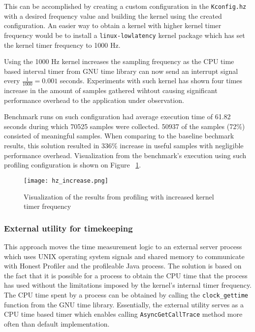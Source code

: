 \documentclass[..thesis.tex]{subfiles}
\begin{document}
This can be accomplished by creating a custom configuration in the \texttt{Kconfig.hz} with a desired frequency value and building the kernel using the created configuration. An easier way to obtain a kernel with higher kernel timer frequency would be to install a \texttt{linux-lowlatency} kernel package which has set the kernel timer frequency to 1000 Hz.

Using the 1000 Hz kernel increases the sampling frequency as the CPU time based interval timer from GNU time library can now send an interrupt signal every $\frac{1}{1000} = 0.001$ seconds. Experiments with such kernel has shown four times increase in the amount of samples gathered wihtout causing significant performance overhead to the application under observation.

Benchmark runs on such configuration had average execution time of 61.82 seconds during which 70525 samples were collected. 50937 of the samples (72\%) consisted of meaningful samples.
When comparing to the baseline bechmark results, this solution resulted in 336\% increase in useful samples with negligible performance overhead. Visualization from the benchmark's execution using such profiling configuration is shown on Figure ~\ref{fig:hz_increase}.
\begin{figure}[H]
\texttt{[image: hz\_increase.png]}
\caption{Visualization of the results from profiling with increased kernel timer frequency}
\label{fig:hz_increase}
\end{figure}

\subsubsection{External utility for timekeeping}
\label{shared-mem}

This approach moves the time measurement logic to an external server process which uses UNIX operating system signals and shared memory to communicate with Honest Profiler and the profileable Java process. The solution is based on the fact that it is possible for a process to obtain the CPU time that the process has used without the limitations imposed by the kernel's internal timer frequency. The CPU time spent by a process can be obtained by calling the \texttt{clock\_\-gettime} function from the GNU time library. Essentially, the external utility serves as a CPU time based timer which enables calling \texttt{Async\-Get\-Call\-Trace} method more often than default implementation.
\end{document}
